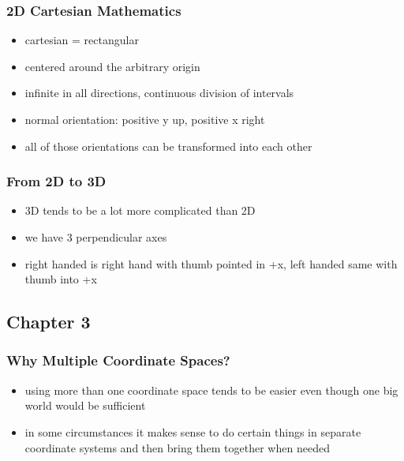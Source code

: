 \documentclass[a4paper,11pt]{amsart}
\begin{document}
\subsubsection{2D Cartesian Mathematics}
\begin{itemize}
    \item cartesian = rectangular
    \item centered around the arbitrary origin
    \item infinite in all directions, continuous division of intervals
    \item normal orientation: positive y up, positive x right
    \item all of those orientations can be transformed into each other
\end{itemize}

\subsubsection{From 2D to 3D}
\begin{itemize}
    \item 3D tends to be a lot more complicated than 2D
    \item we have 3 perpendicular axes 
    \item right handed is right hand with thumb pointed in +x, left handed same
        with thumb into +x
\end{itemize}

\subsection{Chapter 3}

\subsubsection{Why Multiple Coordinate Spaces?}
\begin{itemize}
    \item using more than one coordinate space tends to be easier even though
        one big world would be sufficient
    \item in some circumstances it makes sense to do certain things in separate
        coordinate systems and then bring them together when needed
\end{itemize}
\end{document}
